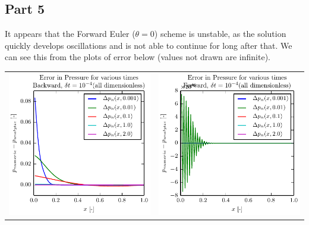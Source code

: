 \documentclass{article}
\begin{document}
\subsection{Part 5}
It appears that the Forward Euler ($\theta = 0$) scheme is unstable, as the solution quickly develops oscillations and is not able to continue for long after that.
We can see this from the plots of error below (values not drawn are infinite).

\begin{tabular}{c c}
\includegraphics[scale=1.0]{error_backward_large.pdf} &
\includegraphics[scale=1.0]{error_forward_large.pdf}
\end{tabular}
\end{document}
